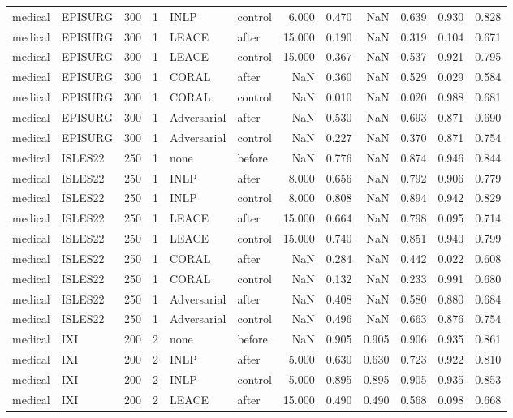 \begin{tabular}{llrrllrrrrrr}
medical & EPISURG & 300 & 1 & INLP & control & 6.000 & 0.470 & NaN & 0.639 & 0.930 & 0.828 \\
medical & EPISURG & 300 & 1 & LEACE & after & 15.000 & 0.190 & NaN & 0.319 & 0.104 & 0.671 \\
medical & EPISURG & 300 & 1 & LEACE & control & 15.000 & 0.367 & NaN & 0.537 & 0.921 & 0.795 \\
medical & EPISURG & 300 & 1 & CORAL & after & NaN & 0.360 & NaN & 0.529 & 0.029 & 0.584 \\
medical & EPISURG & 300 & 1 & CORAL & control & NaN & 0.010 & NaN & 0.020 & 0.988 & 0.681 \\
medical & EPISURG & 300 & 1 & Adversarial & after & NaN & 0.530 & NaN & 0.693 & 0.871 & 0.690 \\
medical & EPISURG & 300 & 1 & Adversarial & control & NaN & 0.227 & NaN & 0.370 & 0.871 & 0.754 \\
medical & ISLES22 & 250 & 1 & none & before & NaN & 0.776 & NaN & 0.874 & 0.946 & 0.844 \\
medical & ISLES22 & 250 & 1 & INLP & after & 8.000 & 0.656 & NaN & 0.792 & 0.906 & 0.779 \\
medical & ISLES22 & 250 & 1 & INLP & control & 8.000 & 0.808 & NaN & 0.894 & 0.942 & 0.829 \\
medical & ISLES22 & 250 & 1 & LEACE & after & 15.000 & 0.664 & NaN & 0.798 & 0.095 & 0.714 \\
medical & ISLES22 & 250 & 1 & LEACE & control & 15.000 & 0.740 & NaN & 0.851 & 0.940 & 0.799 \\
medical & ISLES22 & 250 & 1 & CORAL & after & NaN & 0.284 & NaN & 0.442 & 0.022 & 0.608 \\
medical & ISLES22 & 250 & 1 & CORAL & control & NaN & 0.132 & NaN & 0.233 & 0.991 & 0.680 \\
medical & ISLES22 & 250 & 1 & Adversarial & after & NaN & 0.408 & NaN & 0.580 & 0.880 & 0.684 \\
medical & ISLES22 & 250 & 1 & Adversarial & control & NaN & 0.496 & NaN & 0.663 & 0.876 & 0.754 \\
medical & IXI & 200 & 2 & none & before & NaN & 0.905 & 0.905 & 0.906 & 0.935 & 0.861 \\
medical & IXI & 200 & 2 & INLP & after & 5.000 & 0.630 & 0.630 & 0.723 & 0.922 & 0.810 \\
medical & IXI & 200 & 2 & INLP & control & 5.000 & 0.895 & 0.895 & 0.905 & 0.935 & 0.853 \\
medical & IXI & 200 & 2 & LEACE & after & 15.000 & 0.490 & 0.490 & 0.568 & 0.098 & 0.668 \\

\end{tabular}
